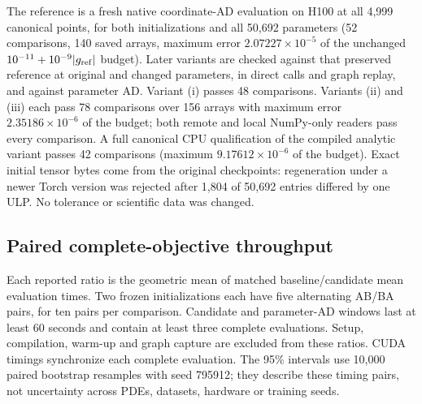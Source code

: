\documentclass[11pt]{article}
\begin{document}
The reference is a fresh native coordinate-AD evaluation on H100 at all
4,999 canonical points, for both initializations and all 50,692 parameters
(52 comparisons, 140 saved arrays, maximum error $2.07227\times10^{-5}$ of
the unchanged $10^{-11}+10^{-9}|g_{\rm ref}|$ budget). Later variants are
checked against that preserved reference at original and changed
parameters, in direct calls and graph replay, and against parameter AD.
Variant (i) passes 48 comparisons. Variants (ii) and (iii) each pass 78
comparisons over 156 arrays with maximum error $2.35186\times10^{-6}$ of
the budget; both remote and local NumPy-only readers pass every comparison.
A full canonical CPU qualification of the compiled analytic variant passes
42 comparisons (maximum $9.17612\times10^{-6}$ of the budget). Exact initial
tensor bytes come from the original checkpoints: regeneration under a newer
Torch version was rejected after 1,804 of 50,692 entries differed by one
ULP. No tolerance or scientific data was changed.

\subsection{Paired complete-objective throughput}\label{sec:c36throughput}
Each reported ratio is the geometric mean of matched baseline/candidate
mean evaluation times. Two frozen initializations each have five
alternating AB/BA pairs, for ten pairs per comparison. Candidate and
parameter-AD windows last at least 60 seconds and contain at least three
complete evaluations. Setup, compilation, warm-up and graph capture are
excluded from these ratios. CUDA timings synchronize each complete
evaluation. The 95\% intervals use 10,000 paired bootstrap resamples with
seed 795912; they describe these timing pairs, not uncertainty across PDEs,
datasets, hardware or training seeds.
\end{document}
